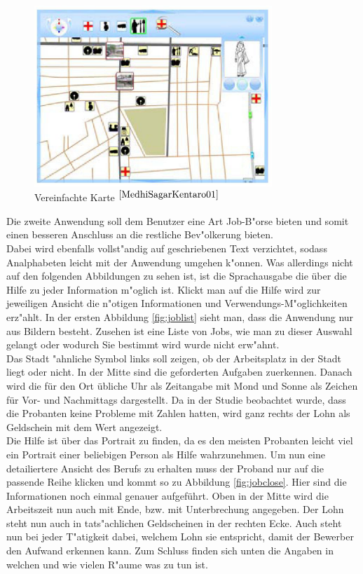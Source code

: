 \begin{figure}[h]
	\centering
		\includegraphics[width=0.8\textwidth]{Daten/map_simple.PNG}
	\caption{Vereinfachte Karte $^{\ref{MedhiSagarKentaro01}}$}
	\label{fig:mapsimple}
\end{figure}
Die zweite Anwendung soll dem Benutzer eine Art Job-B"orse bieten und somit einen besseren Anschluss an die restliche Bev"olkerung bieten.\\
Dabei wird ebenfalls vollst"andig auf geschriebenen Text verzichtet, sodass Analphabeten leicht mit der Anwendung umgehen k"onnen.
Was allerdings nicht auf den folgenden Abbildungen zu sehen ist, ist die Sprachausgabe die über die Hilfe zu jeder Information m"oglich ist. Klickt man auf die Hilfe wird zur jeweiligen Ansicht die n"otigen Informationen und Verwendungs-M"oglichkeiten erz"ahlt.
In der ersten Abbildung \ref{fig:joblist} sieht man, dass die Anwendung nur aus Bildern besteht. Zusehen ist eine Liste von Jobs, wie man zu dieser Auswahl gelangt oder wodurch Sie bestimmt wird wurde nicht erw"ahnt.\\
Das Stadt "ahnliche Symbol links soll zeigen, ob der Arbeitsplatz in der Stadt liegt oder nicht. In der Mitte sind die geforderten Aufgaben zuerkennen. Danach wird die für den Ort übliche Uhr als Zeitangabe mit Mond und Sonne als Zeichen für Vor- und Nachmittags dargestellt. Da in der Studie beobachtet wurde, dass die Probanten keine Probleme mit Zahlen hatten, wird ganz rechts der Lohn als Geldschein mit dem Wert angezeigt.\\
Die Hilfe ist über das Portrait zu finden, da es den meisten Probanten leicht viel ein Portrait einer beliebigen Person als Hilfe wahrzunehmen. Um nun eine detailiertere Ansicht des Berufs zu erhalten muss der Proband nur auf die passende Reihe klicken und kommt so zu Abbildung \ref{fig:jobclose}.
Hier sind die Informationen noch einmal genauer aufgeführt. Oben in der Mitte wird die Arbeitszeit nun auch mit Ende, bzw. mit Unterbrechung angegeben. Der Lohn steht nun auch in tats"achlichen Geldscheinen in der rechten Ecke. Auch steht nun bei jeder T"atigkeit dabei, welchem Lohn sie entspricht, damit der Bewerber den Aufwand erkennen kann. Zum Schluss finden sich unten die Angaben in welchen und wie vielen R"aume was zu tun ist.


